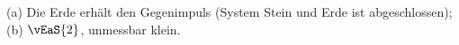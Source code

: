 (a) Die Erde erhält den Gegenimpuls (System Stein und Erde ist abgeschlossen); (b) $\vEaS{2}$, unmessbar klein.
